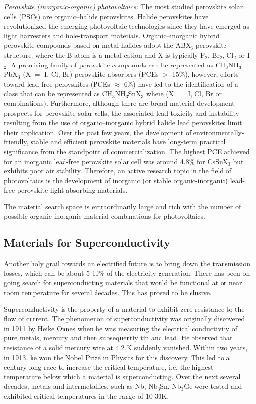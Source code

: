 \documentclass[book.tex]{subfiles}
\begin{document}
\textit{Perovskite (inorganic-organic) photovoltaics}: The most studied perovskite solar cells (PSCs) are organic–halide perovskites. Halide perovskites have revolutionized the emerging photovoltaic technologies since they have emerged as light harvesters and hole-transport materials.\cite{hao2014lead} Organic–inorganic hybrid perovskite compounds based on metal halides adopt the ABX$_3$ perovskite structure, where the B atom is a metal cation and X is typically F$_2$, Br$_2$, Cl$_2$  or I$_2$. A promising family of perovskite compounds can be represented as CH$_3$NH$_3$PbX$_3$ (X $=$ I, Cl, Br) perovskite absorbers (PCEs $>$ 15\%), however, efforts toward lead-free perovskites (PCEs $\approx$ 6\%) have led to the identification of a class that can be represented as CH$_3$NH$_3$SnX$_3$ where (X $=$ I, Cl, Br or combinations). Furthermore, although there are broad material development prospects for perovskite solar cells, the associated lead toxicity and instability resulting from the use of organic–inorganic hybrid halide lead perovskites limit their application. Over the past few years, the development of environmentally-friendly, stable and efficient perovskite materials have long-term practical significance from the standpoint of commercialization. The highest PCE achieved for an inorganic lead-free perovskite solar cell was around 4.8\% for CsSnX$_3$ but exhibits poor air stability. Therefore, an active research topic in the field of photovoltaics is the development of inorganic (or stable organic-inorganic) lead-free perovskite light absorbing materials.

The material search space is extraordinarily large and rich with the number of possible organic-inorganic material combinations for photovoltaics.



\subsection{Materials for Superconductivity}
Another holy grail towards an electrified future is to bring down the transmission losses, which can be about 5-10\% of the electricity generation.  There has been on-going search for superconducting materials that would be functional at or near room temperature for several decades.  This has proved to be elusive.  

Superconductivity is the property of a material to exhibit zero resistance to the flow of current.  The phenomenon of superconductivity was originally discovered in 1911 by Heike Onnes when he was measuring the electrical conductivity of pure metals, mercury and then subsequently tin and lead.  He observed that resistance of a solid mercury wire at 4.2 K suddenly vanished.  Within two years, in 1913, he won the Nobel Prize in Physics for this discovery.  This led to a century-long race to increase the critical temperature, i.e. the highest temperature below which a material is superconducting.  Over the next several decades, metals and intermetallics, such as Nb, Nb$_3$Sn, Nb$_3$Ge were tested and exhibited critical temperatures in the range of 10-30K.  
\end{document}
